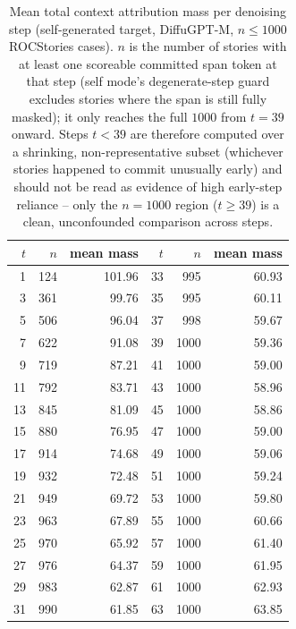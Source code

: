 \begin{table}[t]
\centering
\small
\caption{Mean total context attribution mass per denoising step (self-generated target, DiffuGPT-M, $n{\le}1000$ ROCStories cases). $n$ is the number of stories with at least one scoreable committed span token at that step (self mode's degenerate-step guard excludes stories where the span is still fully masked); it only reaches the full $1000$ from $t{=}39$ onward. Steps $t{<}39$ are therefore computed over a shrinking, non-representative subset (whichever stories happened to commit unusually early) and should not be read as evidence of high early-step reliance -- only the $n{=}1000$ region ($t{\geq}39$) is a clean, unconfounded comparison across steps.}
\label{tab:infill-stepwise-mass}
\begin{tabular}{@{}rrr|rrr@{}}
\toprule
$t$ & $n$ & mean mass & $t$ & $n$ & mean mass \\
\midrule
1  & 124 & 101.96 & 33 & 995  & 60.93 \\
3  & 361 & 99.76  & 35 & 995  & 60.11 \\
5  & 506 & 96.04  & 37 & 998  & 59.67 \\
7  & 622 & 91.08  & 39 & 1000 & 59.36 \\
9  & 719 & 87.21  & 41 & 1000 & 59.00 \\
11 & 792 & 83.71  & 43 & 1000 & 58.96 \\
13 & 845 & 81.09  & 45 & 1000 & 58.86 \\
15 & 880 & 76.95  & 47 & 1000 & 59.00 \\
17 & 914 & 74.68  & 49 & 1000 & 59.06 \\
19 & 932 & 72.48  & 51 & 1000 & 59.24 \\
21 & 949 & 69.72  & 53 & 1000 & 59.80 \\
23 & 963 & 67.89  & 55 & 1000 & 60.66 \\
25 & 970 & 65.92  & 57 & 1000 & 61.40 \\
27 & 976 & 64.37  & 59 & 1000 & 61.95 \\
29 & 983 & 62.87  & 61 & 1000 & 62.93 \\
31 & 990 & 61.85  & 63 & 1000 & 63.85 \\
\bottomrule
\end{tabular}
\end{table}
